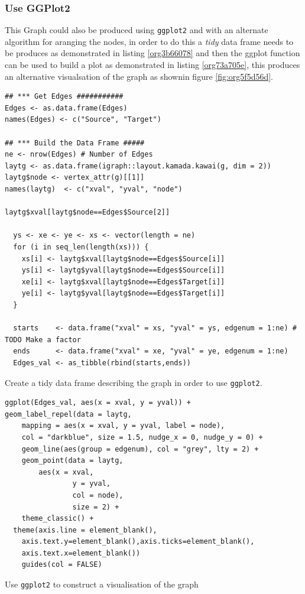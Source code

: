 \documentclass[11pt]{article}
\begin{document}
\subsubsection{Use GGPlot2}
\label{sec:orgf82480c}
This Graph could also be produced using \texttt{ggplot2} and with an alternate algorithm for aranging the nodes, in order to do this a \emph{tidy} data frame needs to be produces as demonstrated in listing \ref{org3b66078} and then the ggplot function can be used to build a plot as demonstrated in listing \ref{org73a705e}, this produces an alternative visualsation of the graph as shownin figure \ref{fig:org5f5d56d}.

\begin{listing}[htbp]
\begin{verbatim}
## *** Get Edges ###########
Edges <- as.data.frame(Edges)
names(Edges) <- c("Source", "Target")

## *** Build the Data Frame #####
ne <- nrow(Edges) # Number of Edges
laytg <- as.data.frame(igraph::layout.kamada.kawai(g, dim = 2))
laytg$node <- vertex_attr(g)[[1]]
names(laytg)  <- c("xval", "yval", "node")

laytg$xval[laytg$node==Edges$Source[2]]

  ys <- xe <- ye <- xs <- vector(length = ne)
  for (i in seq_len(length(xs))) {
    xs[i] <- laytg$xval[laytg$node==Edges$Source[i]]
    ys[i] <- laytg$yval[laytg$node==Edges$Source[i]]
    xe[i] <- laytg$xval[laytg$node==Edges$Target[i]]
    ye[i] <- laytg$yval[laytg$node==Edges$Target[i]]
  }

  starts    <- data.frame("xval" = xs, "yval" = ys, edgenum = 1:ne) # TODO Make a factor
  ends      <- data.frame("xval" = xe, "yval" = ye, edgenum = 1:ne)
  Edges_val <- as_tibble(rbind(starts,ends))
\end{verbatim}
\caption{\label{org3b66078}Create a tidy data frame describing the graph in order to use \texttt{ggplot2}.}
\end{listing}

\begin{listing}[htbp]
\begin{verbatim}
ggplot(Edges_val, aes(x = xval, y = yval)) +
geom_label_repel(data = laytg,
    mapping = aes(x = xval, y = yval, label = node),
    col = "darkblue", size = 1.5, nudge_x = 0, nudge_y = 0) +
    geom_line(aes(group = edgenum), col = "grey", lty = 2) +
    geom_point(data = laytg,
        aes(x = xval,
                y = yval,
                col = node),
                size = 2) +
    theme_classic() +
  theme(axis.line = element_blank(),
    axis.text.y=element_blank(),axis.ticks=element_blank(),
    axis.text.x=element_blank())
    guides(col = FALSE)
\end{verbatim}
\caption{\label{org73a705e}Use \texttt{ggplot2} to construct a visualisation of the graph}
\end{listing}
\end{document}
